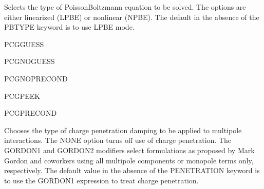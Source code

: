 \documentclass[letterpaper,11pt,english]{sphinxmanual}
\begin{document}
\ignorespaces {}\label{\detokenize{text/keywords:key-pbtype}}\begin{description}
\sphinxAtStartPar
Selects the type of Poisson\sphinxhyphen{}Boltzmann equation to be solved. The options are either linearized (LPBE) or nonlinear (NPBE). The default in the absence of the PBTYPE keyword is to use LPBE mode.

\end{description}

\ignorespaces {}\label{\detokenize{text/keywords:key-pcg-guess}}
\sphinxAtStartPar
PCG\sphinxhyphen{}GUESS

\ignorespaces {}\label{\detokenize{text/keywords:key-pcg-noguess}}
\sphinxAtStartPar
PCG\sphinxhyphen{}NOGUESS

\ignorespaces {}\label{\detokenize{text/keywords:key-pcg-noprecond}}
\sphinxAtStartPar
PCG\sphinxhyphen{}NOPRECOND

\ignorespaces {}\label{\detokenize{text/keywords:key-pcg-peek}}
\sphinxAtStartPar
PCG\sphinxhyphen{}PEEK

\ignorespaces {}\label{\detokenize{text/keywords:key-pcg-precond}}
\sphinxAtStartPar
PCG\sphinxhyphen{}PRECOND

\ignorespaces {}\label{\detokenize{text/keywords:key-penetration}}\begin{description}
\sphinxAtStartPar
Chooses the type of charge penetration damping to be applied to multipole interactions. The NONE option turns off use of charge penetration. The GORDON1 and GORDON2 modifiers select formulations as proposed by Mark Gordon and co\sphinxhyphen{}workers using all multipole components or monopole terms only, respectively. The default value in the absence of the PENETRATION keyword is to use the GORDON1 expression to treat charge penetration.

\end{description}
\end{document}
